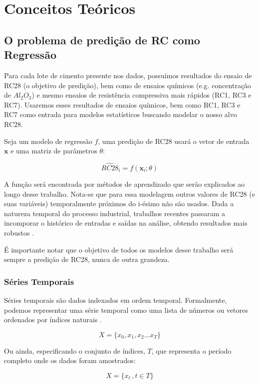 \chapter{Conceitos Teóricos}
\label{cap:conceitos}


\section{O problema de predição de RC como Regressão}

Para cada lote de cimento presente nos dados, possuímos resultados do ensaio de
RC28 (o objetivo de predição), bem como de ensaios químicos (e.g. concentração
de $Al_2O_3$) e mesmo ensaios de resistência compressiva mais rápidos (RC1, RC3 e RC7). Usaremos esses resultados
de ensaios químicos, bem como RC1, RC3 e RC7 como entrada para modelos
estatísticos buscando modelar o nosso alvo RC28.

Seja um modelo de regressão $f$, uma predição de RC28 usará o vetor de entrada
$\textbf{x}$ e uma matriz de parâmetros $\theta$:

\[
  \hat{RC28}_i = f(\textbf{x}_i;\theta)
\]


A função será encontrada por métodos de aprendizado que serão explicados ao
longo desse trabalho. Nota-se que para essa modelagem outros valores de RC28 (e suas variáveis) temporalmente próximos do
i-ésimo não são usados. Dada a natureza temporal do processo industrial,
trabalhos recentes passaram a incomporar o histórico de entradas e saídas na
análise, obtendo resultados mais robustos \citep{grecialin}. 

É importante notar que o objetivo de todos os modelos desse
trabalho será sempre a predição de RC28, nunca de outra grandeza.

\subsection{Séries Temporais}

Séries temporais são dados indexados em ordem temporal. Formalmente, podemos
representar uma série temporal como uma lista de números ou vetores ordenados
por índices naturais \citep{spec}.

\[
X = \{x_0,x_1,x_2 \dots x_T\}
\]

Ou ainda, especificando o conjunto de índices, $T$, que representa o período
completo onde os dados foram amostrados:


\[
  X = \{x_t \, , t \in T\}
\]


